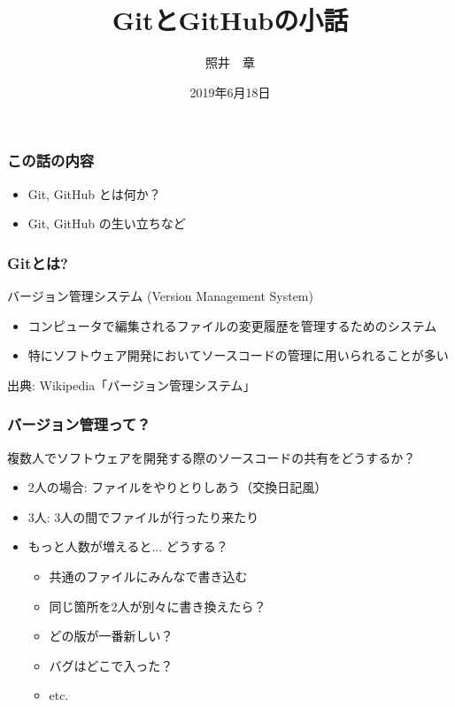 \documentclass[dvipdfmx]{beamer}
\title{GitとGitHubの小話}
\author{照井　章}
\institute{筑波大学 数理物質系}
\date{2019年6月18日}
\begin{document}
    
\begin{frame}
    \frametitle{}
    \titlepage
\end{frame}

\begin{frame}
    \frametitle{この話の内容}
    \large
    \begin{itemize}
        \item Git, GitHub とは何か？
        \item Git, GitHub の生い立ちなど
    \end{itemize}
\end{frame}

\begin{frame}
    \frametitle{Gitとは?}

    \begin{block}{バージョン管理システム (Version Management System)}
        \begin{itemize}
            \item コンピュータで編集されるファイルの変更履歴を管理するためのシステム
            \item 特にソフトウェア開発においてソースコードの管理に用いられることが多い
        \end{itemize}
    \end{block}

    \begin{flushright}
        出典: Wikipedia「バージョン管理システム」\cite{vcs}
    \end{flushright}
\end{frame}

\begin{frame}
    \frametitle{バージョン管理って？}
    複数人でソフトウェアを開発する際のソースコードの共有をどうするか？

    \begin{itemize}
        \item<1-> 2人の場合: ファイルをやりとりしあう（交換日記風）
        \item<2-> 3人: 3人の間でファイルが行ったり来たり
        \item<3-> もっと人数が増えると... どうする？
        \begin{itemize}
            \item<4-> 共通のファイルにみんなで書き込む
            \item<5-> 同じ箇所を2人が別々に書き換えたら？
            \item<6-> どの版が一番新しい？
            \item<7-> バグはどこで入った？
            \item<8-> etc.
        \end{itemize}
    \end{itemize}{}

\end{frame}
\end{document}

